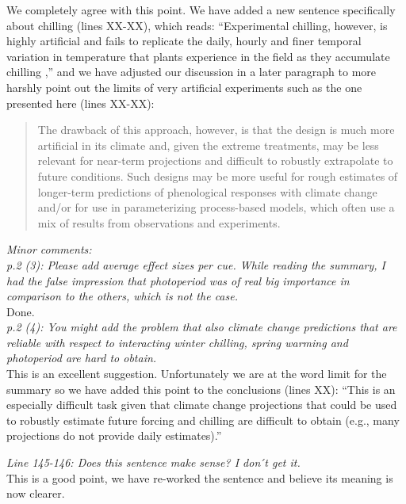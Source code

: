 \documentclass[11pt,a4paper]{article}
\begin{document}
We completely agree with this point. We have added a new sentence specifically about chilling (lines XX-XX), which reads: ``Experimental chilling, however, is highly artificial and fails to replicate the daily, hourly and finer temporal variation in temperature that plants experience in the field as they accumulate chilling \citep{Erez:1988,Luedeling:2009},'' and we have adjusted our discussion in a later paragraph to more harshly point out the limits of very artificial experiments such as the one presented here (lines XX-XX):

\begin{quote}
The drawback of this approach, however, is that the design is much more artificial in its climate and, given the extreme treatments, may be less relevant for near-term projections and difficult to robustly extrapolate to future conditions. Such designs may be more useful for rough estimates of longer-term predictions of phenological responses with climate change and/or for use in parameterizing process-based models, which often use a mix of results from observations and experiments.
\end{quote}

\emph{Minor comments:\\
p.2 (3): Please add average effect sizes per cue. While reading the summary, I had the false
impression that photoperiod was of real big importance in comparison to the others, which is
not the case.}\\

Done.\\

\emph{p.2 (4): You might add the problem that also climate change predictions that are reliable
with respect to interacting winter chilling, spring warming and photoperiod are hard to
obtain.}\\

This is an excellent suggestion. Unfortunately we are at the word limit for the summary so we have added this point to the conclusions (lines XX): ``This is an especially difficult task given that climate change projections that could be used to robustly estimate future forcing and chilling are difficult to obtain (e.g., many projections do not provide daily estimates).''

\emph{Line 145-146: Does this sentence make sense? I don ́t get it.}\\

This is a good point, we have re-worked the sentence and believe its meaning is now clearer. 
\end{document}
